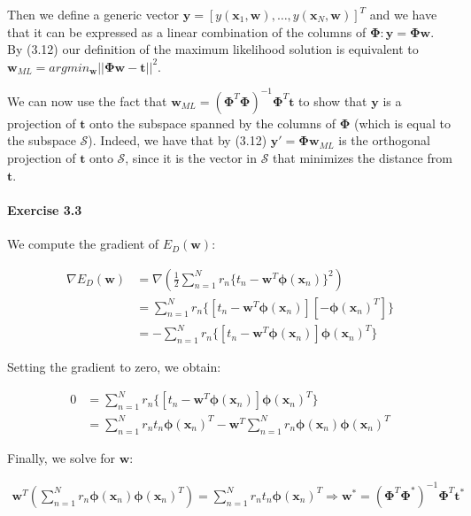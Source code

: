 Then we define a generic vector $\mathbf{y} = [y(\mathbf{x}_1, \mathbf{w}), \dots, y(\mathbf{x}_N, \mathbf{w})]^T$ and we have that it can be expressed as a linear combination of the columns of $\mathbf{\Phi}: \mathbf{y} = \mathbf{\Phi} \mathbf{w}$.
By (3.12) our definition of the maximum likelihood solution is equivalent to $\mathbf{w}_{ML} = argmin_{\mathbf{w}} ||\mathbf{\Phi}\mathbf{w} - \mathbf{t}||^2$.

We can now use the fact that $\mathbf{w}_{ML} = (\mathbf{\Phi}^T\mathbf{\Phi})^{-1}\mathbf{\Phi}^T \mathbf{t}$ to show that $\mathbf{y}$ is a projection of $\mathbf{t}$ onto the subspace spanned by the columns of $\mathbf{\Phi}$ (which is equal to the subspace $\mathcal{S}$).
Indeed, we have that by (3.12) $\mathbf{y}' = \mathbf{\Phi}\mathbf{w}_{ML}$ is the orthogonal projection of $\mathbf{t}$ onto $\mathcal{S}$, since it is the vector in $\mathcal{S}$ that minimizes the distance from $\mathbf{t}$.

\paragraph{Exercise 3.3}

We compute the gradient of $E_D(\mathbf{w})$:

\begin{align*}
    \nabla E_D(\mathbf{w}) &= \nabla (\frac{1}{2} \sum_{n = 1}^{N} r_n \{t_n - \mathbf{w}^T \pmb{\phi}(\mathbf{x}_n)\}^2) \\
    &= \sum_{n = 1}^{N} r_n \{ [t_n - \mathbf{w}^T \pmb{\phi}(\mathbf{x}_n)] [-\pmb{\phi}(\mathbf{x}_n)^T] \} \\
    &= - \sum_{n = 1}^{N} r_n \{ [t_n - \mathbf{w}^T \pmb{\phi}(\mathbf{x}_n)] \pmb{\phi}(\mathbf{x}_n)^T \}
\end{align*}

Setting the gradient to zero, we obtain:

\begin{align*}
    0 &= \sum_{n = 1}^{N} r_n \{ [t_n - \mathbf{w}^T \pmb{\phi}(\mathbf{x}_n)] \pmb{\phi}(\mathbf{x}_n)^T \} \\
    &= \sum_{n = 1}^{N} r_n t_n \pmb{\phi}(\mathbf{x}_n)^T - \mathbf{w}^T \sum_{n = 1}^{N} r_n \pmb{\phi}(\mathbf{x}_n) \pmb{\phi}(\mathbf{x}_n)^T
\end{align*}

Finally, we solve for $\mathbf{w}$:

\begin{align*}
    \mathbf{w}^T(\sum_{n=1}^{N} r_n \pmb{\phi}(\mathbf{x}_n) \pmb{\phi}(\mathbf{x}_n)^T) = \sum_{n=1}^{N} r_n t_n \pmb{\phi}(\mathbf{x}_n)^T
    \Rightarrow \mathbf{w}^* = (\pmb{\Phi}^{T}\pmb{\Phi}^{*})^{-1} \pmb{\Phi}^{T} \mathbf{t}^{*}
\end{align*}

